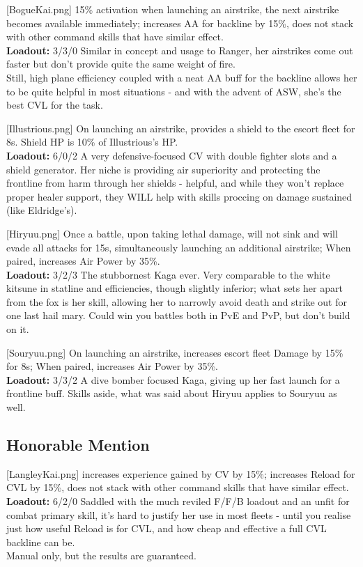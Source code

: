 [BogueKai.png]
{15\% activation when launching an airstrike, the next airstrike becomes available immediately; increases AA for backline by 15\%, does not stack with other command skills that have similar effect.\\
\textbf{Loadout:} 3/3/0}
{}
{Similar in concept and usage to Ranger, her airstrikes come out faster but don't provide quite the same weight of fire.\\
Still, high plane efficiency coupled with a neat AA buff for the backline allows her to be quite helpful in most situations - and with the advent of ASW, she's the best CVL for the task.}
 
[Illustrious.png]
{On launching an airstrike, provides a shield to the escort fleet for 8s. Shield HP is 10\% of Illustrious's HP.\\
\textbf{Loadout:} 6/0/2}
{}
{A very defensive-focused CV with double fighter slots and a shield generator. Her niche is providing air superiority and protecting the frontline from harm through her shields - helpful, and while they won't replace proper healer support, they WILL help with skills proccing on damage sustained (like Eldridge's).}
 
[Hiryuu.png]
{Once a battle, upon taking lethal damage, will not sink and will evade all attacks for 15s, simultaneously launching an additional airstrike; When paired, increases Air Power by 35\%.\\
\textbf{Loadout:} 3/2/3}
{}
{The stubbornest Kaga ever. Very comparable to the white kitsune in statline and efficiencies, though slightly inferior; what sets her apart from the fox is her skill, allowing her to narrowly avoid death and strike out for one last hail mary. Could win you battles both in PvE and PvP, but don't build on it.}
 
[Souryuu.png]
{On launching an airstrike, increases escort fleet Damage by 15\% for 8s; When paired, increases Air Power by 35\%. \\
\textbf{Loadout:} 3/3/2}
{}
{A dive bomber focused Kaga, giving up her fast launch for a frontline buff. Skills aside, what was said about Hiryuu applies to Souryuu as well.}
 

\newpage
\subsection{Honorable Mention}
[LangleyKai.png]
{increases experience gained by CV by 15\%; increases Reload for CVL by 15\%, does not stack with other command skills that have similar effect. \\
\textbf{Loadout:} 6/2/0}
{}
{Saddled with the much reviled F/F/B loadout and an unfit for combat primary skill, it's hard to justify her use in most fleets - until you realise just how useful Reload is for CVL, and how cheap and effective a full CVL backline can be.\\
Manual only, but the results are guaranteed.}

